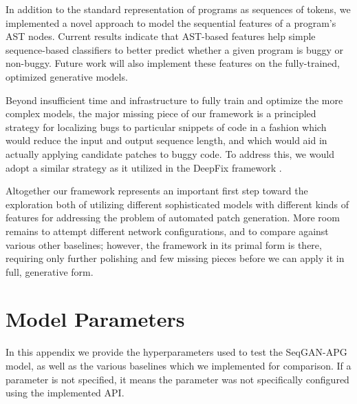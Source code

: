 \documentclass[sigconf]{acmart}
\begin{document}
In addition to the standard representation of programs as sequences of tokens, we implemented a novel approach to model the sequential features of a program's AST nodes. Current results indicate that AST-based features help simple sequence-based classifiers to better predict whether a given program is buggy or non-buggy. Future work will also implement these features on the fully-trained, optimized generative models.

Beyond insufficient time and infrastructure to fully train and optimize the more complex models, the major missing piece of our framework is a principled strategy for localizing bugs to particular snippets of code in a fashion which would reduce the input and output sequence length, and which would aid in actually applying candidate patches to buggy code. To address this, we would adopt a similar strategy as it utilized in the DeepFix framework \cite{gupta2017deepfix}.

Altogether our framework represents an important first step toward the exploration both of utilizing different sophisticated models with different kinds of features for addressing the problem of automated patch generation. More room remains to attempt different network configurations, and to compare against various other baselines; however, the framework in its primal form is there, requiring only further polishing and few missing pieces before we can apply it in full, generative form.

\clearpage
\appendix




\section{Model Parameters}
\label{app:model_params}
In this appendix we provide the hyperparameters used to test the SeqGAN-APG model, as well as the various baselines which we implemented for comparison. If a parameter is not specified, it means the parameter was not specifically configured using the implemented API.
\end{document}
